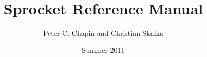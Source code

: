 \documentclass{article}
\begin{document}
\title{Sprocket Reference Manual}
\author{Peter C. Chapin and Christian Skalka}
\date{Summer 2011}
\maketitle


\tableofcontents
\newpage
{}









{
\small

}
\end{document}
